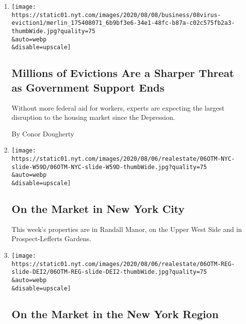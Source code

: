 \begin{enumerate}
\def\labelenumi{\arabic{enumi}.}
\item
  \href{/2020/08/07/business/economy/housing-economy-eviction-renters.html}{}

  \texttt{[image: https://static01.nyt.com/images/2020/08/08/business/08virus-eviction1/merlin\_175408071\_6b9bf3e6-34e1-48fc-b87a-c02c575fb2a3-thumbWide.jpg?quality=75\\\&auto=webp\\\&disable=upscale]}

  \hypertarget{millions-of-evictions-are-a-sharper-threat-as-government-support-ends}{%
  \subsection{Millions of Evictions Are a Sharper Threat as Government
  Support
  Ends}\label{millions-of-evictions-are-a-sharper-threat-as-government-support-ends}}

  Without more federal aid for workers, experts are expecting the
  largest disruption to the housing market since the Depression.

  By Conor Dougherty
\item
  \href{/slideshow/2020/08/06/realestate/on-the-market-in-new-york-city.html}{}

  \texttt{[image: https://static01.nyt.com/images/2020/08/06/realestate/06OTM-NYC-slide-W59D/06OTM-NYC-slide-W59D-thumbWide.jpg?quality=75\\\&auto=webp\\\&disable=upscale]}

  \hypertarget{on-the-market-in-new-york-city}{%
  \subsection{On the Market in New York
  City}\label{on-the-market-in-new-york-city}}

  This week's properties are in Randall Manor, on the Upper West Side
  and in Prospect-Lefferts Gardens.
\item
  \href{/slideshow/2020/08/06/realestate/on-the-market-in-the-new-york-region.html}{}

  \texttt{[image: https://static01.nyt.com/images/2020/08/06/realestate/06OTM-REG-slide-DEI2/06OTM-REG-slide-DEI2-thumbWide.jpg?quality=75\\\&auto=webp\\\&disable=upscale]}

  \hypertarget{on-the-market-in-the-new-york-region}{%
  \subsection{On the Market in the New York
  Region}\label{on-the-market-in-the-new-york-region}}


\end{enumerate}
